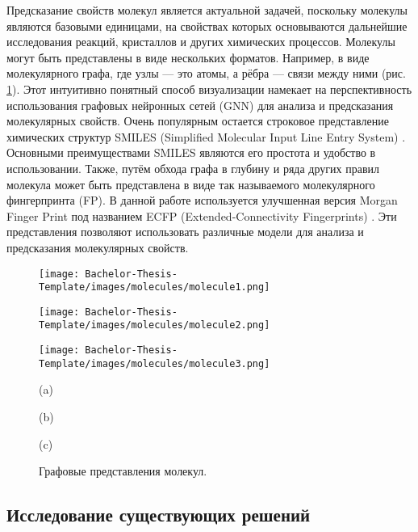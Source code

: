 Предсказание свойств молекул является актуальной задачей, поскольку молекулы являются базовыми единицами, на свойствах которых основываются дальнейшие исследования реакций, кристаллов и других химических процессов. Молекулы могут быть представлены в виде нескольких форматов. Например, в виде молекулярного графа, где узлы — это атомы, а рёбра — связи между ними (рис. \ref{fig:molecules}). Этот интуитивно понятный способ визуализации намекает на перспективность использования графовых нейронных сетей (GNN) для анализа и предсказания молекулярных свойств. Очень популярным остается строковое представление химических структур SMILES (Simplified Molecular Input Line Entry System) \cite{SMILES}. Основными преимуществами SMILES являются его простота и удобство в использовании. Также, путём обхода графа в глубину и ряда других правил молекула может быть представлена в виде так называемого молекулярного фингерпринта (FP). В данной работе используется улучшенная версия Morgan Finger Print под названием ECFP (Extended-Connectivity Fingerprints) \cite{ECFP}. Эти представления позволяют использовать различные модели для анализа и предсказания молекулярных свойств.
\begin{figure}[h]
\begin{minipage}{0.33\textwidth}
  \centering
\texttt{[image: Bachelor-Thesis-Template/images/molecules/molecule1.png]}
\end{minipage}%
\begin{minipage}{0.33\textwidth}
  \centering
\texttt{[image: Bachelor-Thesis-Template/images/molecules/molecule2.png]}
\end{minipage}%
\begin{minipage}{0.33\textwidth}
  \centering
\texttt{[image: Bachelor-Thesis-Template/images/molecules/molecule3.png]}
\end{minipage}%
\newline
\begin{minipage}{0.33\textwidth}
  \centering
(a)
\end{minipage}%
\begin{minipage}{0.33\textwidth}
\centering
 (b)
\end{minipage}%
\begin{minipage}{0.33\textwidth}
\centering
  (c)
\end{minipage}%
\caption{\small Графовые представления молекул.}
    \label{fig:molecules}
\end{figure}


\subsection{Исследование существующих решений}

